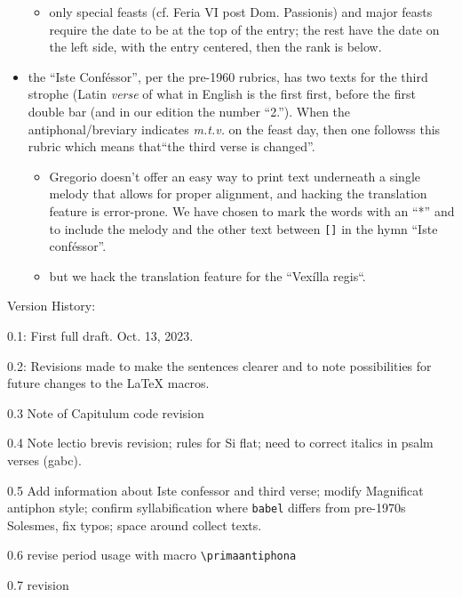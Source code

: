 \documentclass[11pt]{article}
\begin{document}
\begin{itemize}
\begin{itemize}
\item only special feasts (cf. Feria VI post Dom. Passionis) and major feasts require the date to be at the top of the entry; the rest have the date on the left side, with the entry centered, then the rank is below.
\end{itemize}
\item the ``Iste Conféssor'', per the pre-1960 rubrics, has two texts for the third strophe (Latin \textit{verse} of what in English is the first first, before the first double bar (and in our edition the number ``2.''). When the antiphonal/breviary indicates \textit{m.t.v.} on the feast day, then one followss this rubric which means that``the third verse is changed''.

\begin{itemize}
\item
Gregorio doesn't offer an easy way to print text underneath a single melody that allows for proper alignment, and hacking the translation feature is error-prone. We have chosen to mark the words with an ``*'' and to include the melody and the other text between \verb|[]| in the hymn ``Iste conféssor''.
\item but we hack the translation feature for the ``Vexílla regis``.
\end{itemize}
\end{itemize}

Version History:

0.1: First full draft. Oct. 13, 2023.

0.2: Revisions made to make the sentences clearer and to note possibilities for future changes to the LaTeX{} macros.

0.3 Note of Capitulum code revision

0.4 Note lectio brevis revision; rules for Si flat; need to correct italics in psalm verses (gabc).

0.5 Add information about Iste confessor and third verse; modify Magnificat antiphon style; confirm syllabification where \verb|babel| differs from pre-1970s Solesmes, fix typos; space around collect texts.

0.6 revise period usage with macro \verb|\primaantiphona|

0.7 revision
\end{document}
